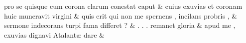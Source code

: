 \documentclass[12pt,onecolumn,twoside,a4paper]{memoir}
\begin{document}
\begin{pairs}
\begin{Leftside}
                              pro
                              se
                              quisque
                              cum
                              corona
                              clarum
                              conestat
                              caput \&
                         \stanza {}
                     cuius
                              exuvias
                              et
                              coronam
                              huic
                              muneravit
                              virgini \&
                         \stanza {}
                              quis
                              erit
                              qui
                              non
                              me
                              spernens
                              ,
                              incilans
                              probris
                              , & 
                     sermone
                              indecorans
                              turpi
                              fama
                              differet
                              ? \&
                         \stanza {}
                              .
                              .
                              .
                              remanet
                              gloria & 
                     apud
                              me
                              ,
                              exuvias
                              dignavi
                              Atalantæ
                              dare \&
                         \stanza {}
                     

\end{Leftside}
\end{pairs}
\end{document}
